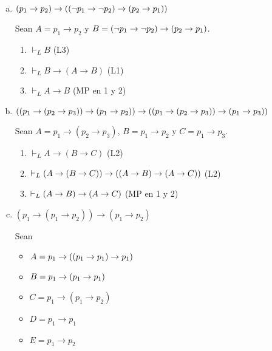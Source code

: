 \begin{enumerate}[(a)]
    \item $(p_1 \to p_2) \to ((\neg p_1 \to \neg p_2) \to (p_2 \to p_1))$
    \begin{solution}
    Sean $A = p_1 \to p_2$ y $B = (\neg p_1 \to \neg p_2) \to (p_2 \to p_1)$.
    \begin{enumerate}[1.]
        \item $\vdash_L B$               \hfill (L3)
        \item $\vdash_L B \to (A \to B)$ \hfill (L1)
        \item $\vdash_L        A \to B$  \hfill (MP en 1 y 2)
    \end{enumerate}
    \end{solution}
    
    \item $((p_1 \to (p_2 \to p_3)) \to (p_1 \to p_2)) \to ((p_1 \to (p_2 \to p_3)) \to (p_1 \to p_3))$
    \begin{solution}
    Sean $A = p_1 \to (p_2 \to p_3)$, $B = p_1 \to p_2$ y $C = p_1 \to p_3$.
    \begin{enumerate}[1.]
        \item $\vdash_L A \to (B \to C)$ \hfill (L2)
        \item $\vdash_L (A \to (B \to C)) \to ((A \to B) \to (A \to C))$        \hfill (L2)
        \item $\vdash_L (A \to B) \to (A \to C)$        \hfill (MP en 1 y 2)
    \end{enumerate}
    \end{solution}
    
    \item $(p_1 \to (p_1 \to p_2)) \to (p_1 \to p_2)$
    \begin{solution}
    Sean
    \begin{itemize}
        \item $A = p_1 \to ((p_1 \to p_1) \to p_1)$
        \item $B = p_1 \to (p_1 \to p_1)$
        \item $C = p_1 \to (p_1 \to p_2)$
        \item $D = p_1 \to p_1$
        \item $E = p_1 \to p_2$
    \end{itemize}
    

\end{solution}
\end{enumerate}
